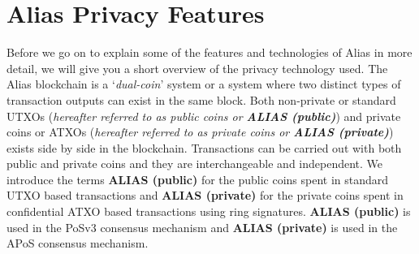 \section{Alias Privacy Features}
Before we go on to explain some of the features and technologies of
Alias in more detail, we will give you a short overview of the
privacy technology used. The Alias blockchain is a ‘\textit{dual-coin}’
system or a system where two distinct types of transaction outputs can
exist in the same block. Both non-private or standard UTXOs (\textit{hereafter
referred to as public coins or \textbf{ALIAS (public)}}) and private coins or ATXOs 
(\textit{hereafter referred to as private coins or \textbf{ALIAS (private)}}) exists 
side by side in the blockchain. Transactions can be carried out with both 
public and private coins and they are interchangeable and independent. We 
introduce the terms \textbf{ALIAS (public)} for the public coins spent in standard UTXO based 
transactions and \textbf{ALIAS (private)} for the private coins spent in  confidential ATXO based
transactions using ring signatures. \textbf{ALIAS (public)} is used in the PoSv3 consensus
mechanism and \textbf{ALIAS (private)} is used in the APoS consensus mechanism.



